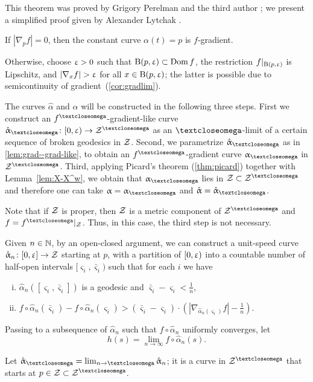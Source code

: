 This theorem was proved by Grigory Perelman and the third author \cite{perelman-petrunin:qg};
we present a simplified proof given by Alexander Lytchak \cite{lytchak:open-map}.

If $|\nabla_p f|=0$, then the constant curve $\alpha(t)=p$ is $f$-gradient.

Otherwise, choose $\upvarepsilon>0$ 
such that $\oBall(p,\eps)\subset\Dom f$,
the restriction $f|_{\mathrm{B}{}(p,\upvarepsilon)}$ is Lipschitz, 
and $|\nabla_x f|>\eps$ for all $x\in \oBall(p,\eps)$;
the latter is possible due to semicontinuity of \textbar gradient\textbar\ (\ref{cor:gradlim}).

The curves $\hat\alpha$ and $\alpha$ will be constructed in the following three steps.
First we construct an $f^\o$-gradient-like curve $\hat\alpha_\o\:[0,\eps)\to\spc{Z}^\o$ as an $\o$-limit of a certain sequence of broken geodesics in $\mathcal{Z}$.
Second, we parametrize $\hat\alpha_\o$ as in \ref{lem:grad--grad-like}, to obtain an $f^\o$-gradient curve $\alpha_\o$ in $\spc{Z}^\o$.
Third, applying Picard's theorem (\ref{thm:picard}) together with Lemma~\ref{lem:X-X^w}, we obtain that $\alpha_\o$ lies in $\spc{Z}\subset \spc{Z}^\o$ and therefore one can take $\alpha=\alpha_\o$ and $\hat\alpha=\hat\alpha_\o$.

Note that if $\mathcal{Z}$ is proper, then $\mathcal{Z}$ is a metric component of $\spc{Z}^\o$ and $f=f^\o|_{\spc{Z}}$.
Thus, in this case, the third step is not necessary.

Given $n\in \NN$, 
by an open-closed argument,
we can construct a unit-speed curve $\hat\alpha_n\:[0,\eps] \to \spc{Z}$ starting at $p$, with a partition of $[0,\upvarepsilon)$ into a countable number of half-open intervals $[\varsigma_i,\bar\varsigma_i)$ 
such that for each $i$ we have 
\begin{enumerate}[(i)]
\item $\hat\alpha_n([\varsigma_i,\bar\varsigma_i])$ is a geodesic and $\bar\varsigma_i-\varsigma_i<\tfrac{1}{n}$,
\item\label{alm-grad} 
$f\circ\hat\alpha_n(\bar\varsigma_i)-f\circ\hat\alpha_n(\varsigma_i)
>
(\bar\varsigma_i-\varsigma_i)
\cdot
(|\nabla_{\hat\alpha_n(\varsigma_i)}f|-\tfrac{1}{n}).$
\end{enumerate}

Passing to a subsequence of $\hat\alpha_n$ such that $f\circ\hat\alpha_n$ uniformly converges, let 
\[h(s)=\lim_{n\to\infty}f\circ\hat\alpha_n(s).\]

Let $\hat\alpha_\o=\lim_{n\to\o}\hat\alpha_{n}$;
it is a curve in $\spc{Z}^\o$ that starts at $p\in \spc{Z}\subset \spc{Z}^\o$.

